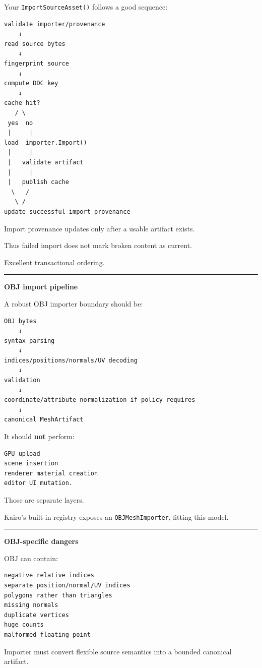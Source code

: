 Your \texttt{ImportSourceAsset()} follows a good sequence:

\begin{verbatim}
validate importer/provenance
    ↓
read source bytes
    ↓
fingerprint source
    ↓
compute DDC key
    ↓
cache hit?
   / \
 yes  no
 |     |
load  importer.Import()
 |     |
 |   validate artifact
 |     |
 |   publish cache
  \   /
   \ /
update successful import provenance
\end{verbatim}

Import provenance updates only after a usable artifact exists.

Thus failed import does not mark broken content as current.

Excellent transactional ordering.

\begin{center}\rule{0.5\linewidth}{0.5pt}\end{center}

\textbf{OBJ import pipeline}

A robust OBJ importer boundary should be:

\begin{verbatim}
OBJ bytes
    ↓
syntax parsing
    ↓
indices/positions/normals/UV decoding
    ↓
validation
    ↓
coordinate/attribute normalization if policy requires
    ↓
canonical MeshArtifact
\end{verbatim}

It should \textbf{not} perform:

\begin{verbatim}
GPU upload
scene insertion
renderer material creation
editor UI mutation.
\end{verbatim}

Those are separate layers.

Kairo's built-in registry exposes an \texttt{OBJMeshImporter}, fitting this model.

\begin{center}\rule{0.5\linewidth}{0.5pt}\end{center}

\textbf{OBJ-specific dangers}

OBJ can contain:

\begin{verbatim}
negative relative indices
separate position/normal/UV indices
polygons rather than triangles
missing normals
duplicate vertices
huge counts
malformed floating point
\end{verbatim}

Importer must convert flexible source semantics into a bounded canonical artifact.


